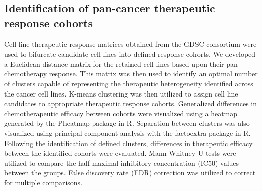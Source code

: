 \documentclass[10pt, letterpaper]{article}
\begin{document}
\begin{multicols}{2}
\subsection*{Identification of pan-cancer therapeutic response cohorts}
Cell line therapeutic response matrices obtained from the GDSC consortium were used to bifurcate candidate cell lines into defined response cohorts. We developed a Euclidean distance matrix for the retained cell lines based upon their pan-chemotherapy response. This matrix was then used to identify an optimal number of clusters capable of representing the therapeutic heterogeneity identified across the cancer cell lines. K-means clustering was then utilized to assign cell line candidates to appropriate therapeutic response cohorts. Generalized differences in chemotherapeutic efficacy between cohorts were visualized using a heatmap generated by the Pheatmap package in R. Separation between clusters was also visualized using principal component analysis with the factoextra package in R. Following the identification of defined clusters, differences in therapeutic efficacy between the identified cohorts were evaluated. Mann-Whitney U tests were utilized to compare the half-maximal inhibitory concentration (IC50) values between the groups. False discovery rate (FDR) correction was utilized to correct for multiple comparisons.



\end{multicols}
\end{document}
